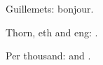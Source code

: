 \documentclass{article}
\begin{document}
Guillemets: \guillemotleft bonjour\guillemotright.

Thorn, eth and eng: \TH{} \th{} \DH{} \dh{} \NG{} \ng{}.

Per thousand: \textperthousand{} and \textpertenthousand.
\end{document}

